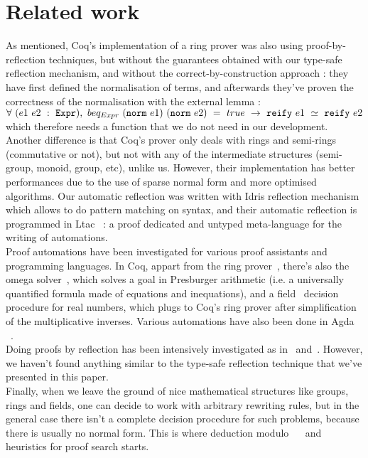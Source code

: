 \section{Related work}
\label{sect:relatedWork}

As mentioned, Coq's implementation of a ring prover was also using proof-by-reflection techniques, but without the guarantees obtained with our type-safe reflection mechanism, and without the correct-by-construction approach : they have first defined the normalisation of terms, and afterwards they've proven the correctness of the normalisation with the external lemma :
$\forall\ (e1\ e2\ :\ \code{Expr}),\ beq_{Expr}\ (\code{norm}\ e1)\ (\code{norm}\ e2)\ =\ true\ \rightarrow\ \code{reify}\ e1\ \simeq\ \code{reify}\ e2$ which therefore needs a  function that we do not need in our development. Another difference is that Coq's prover only deals with rings and semi-rings (commutative or not), but not with any of the intermediate structures (semi-group, monoid, group, etc), unlike us. However, their implementation has better performances due to the use of sparse normal form and more optimised algorithms.
Our automatic reflection was written with Idris reflection mechanism which allows to do pattern matching on syntax, and their automatic reflection is programmed in Ltac~\cite{DelahayeLTac} : a proof dedicated and untyped meta-language for the writing of automations. \\

Proof automations have been investigated for various proof assistants and programming languages. In Coq, appart from the ring prover~\cite{Coq2005}, there's also the omega solver~\cite{Cregut04}, which solves a goal in Presburger arithmetic (i.e. a universally quantified formula made of equations and inequations), and a field~\cite{DelahayeField} decision procedure for real numbers, which plugs to Coq's ring prover after simplification of the multiplicative inverses. Various automations have also been done in Agda~\cite{DBLP:conf/mpc/KokkeS15} ~\cite{Lindblad04}. \\

Doing proofs by reflection has been intensively investigated as in~\cite{ChlipalaBook} and~\cite{Malecha14}. However, we haven't found anything similar to the type-safe reflection technique that we've presented in this paper. \\

Finally, when we leave the ground of nice mathematical structures like groups, rings and fields, one can decide to work with arbitrary rewriting rules, but in the general case there isn't a complete decision procedure for such problems, because there is usually no normal form. This is where deduction modulo~\cite{Dowek03} ~\cite{DelahayeModulo} and heuristics for proof search starts. \\


